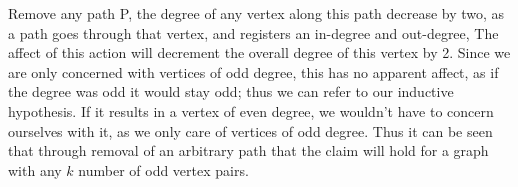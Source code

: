 \documentclass[10pt]{article}
\begin{document}
\begin{question}
\begin{enumerate}[a)]
             \newline
            Remove any path P, the degree of any vertex along this path decrease by two, as a path goes through that vertex, and registers an in-degree and out-degree, The affect of this action will decrement the overall degree of this vertex by 2. Since we are only concerned with vertices of odd degree, this has no apparent affect, as if the degree was odd it would stay odd; thus we can refer to our inductive hypothesis. If it results in a vertex of even degree, we wouldn't have to concern ourselves with it,  as we only care of vertices of odd degree. \newline \newline
            Thus it can be seen that through removal of an arbitrary path that the claim will hold for a graph with any $k$ number of odd vertex pairs.
            
    \end{enumerate}
\end{question} 
\end{document}
